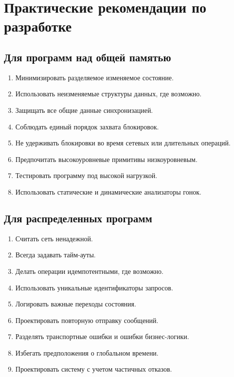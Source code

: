 \documentclass[12pt,a4paper]{article}
\begin{document}
\section{Практические рекомендации по разработке}

\subsection{Для программ над общей памятью}

\begin{enumerate}
    \item Минимизировать разделяемое изменяемое состояние.
    \item Использовать неизменяемые структуры данных, где возможно.
    \item Защищать все общие данные синхронизацией.
    \item Соблюдать единый порядок захвата блокировок.
    \item Не удерживать блокировки во время сетевых или длительных операций.
    \item Предпочитать высокоуровневые примитивы низкоуровневым.
    \item Тестировать программу под высокой нагрузкой.
    \item Использовать статические и динамические анализаторы гонок.
\end{enumerate}

\subsection{Для распределенных программ}

\begin{enumerate}
    \item Считать сеть ненадежной.
    \item Всегда задавать тайм-ауты.
    \item Делать операции идемпотентными, где возможно.
    \item Использовать уникальные идентификаторы запросов.
    \item Логировать важные переходы состояния.
    \item Проектировать повторную отправку сообщений.
    \item Разделять транспортные ошибки и ошибки бизнес-логики.
    \item Избегать предположения о глобальном времени.
    \item Проектировать систему с учетом частичных отказов.
\end{enumerate}
\end{document}
